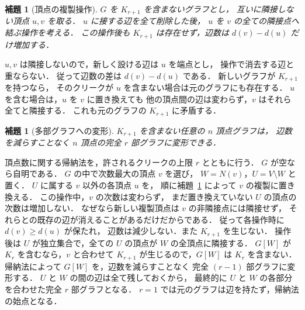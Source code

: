 \documentclass[a5paper,10pt,onecolumn]{jsarticle}
\makeatletter
\theoremstyle{mathnotetheorem}
\newtheorem{lemma}[theorem]{補題}
\renewcommand{\proofname}{証明}
\renewenvironment{proof}[1][\proofname]{%
  \par\pushQED{\qed}\normalfont\topsep4\p@\@plus2\p@\relax
  \trivlist\item[\hskip\labelsep\bfseries #1]\ignorespaces
}{\popQED\endtrivlist\@endpefalse}
\makeatother
\begin{document}
\begin{lemma}[頂点の複製操作]\label{lem:clone}
$G$ を $K_{r+1}$ を含まないグラフとし，
互いに隣接しない頂点 $u,v$ を取る．
$u$ に接する辺を全て削除した後，
$u$ を $v$ の全ての隣接点へ結ぶ操作を考える．
この操作後も $K_{r+1}$ は存在せず，辺数は
$d(v)-d(u)$ だけ増加する．
\end{lemma}
\begin{proof}
$u,v$ は隣接しないので，新しく設ける辺は $u$ を端点とし，
操作で消去する辺と重ならない．
従って辺数の差は $d(v)-d(u)$ である．
新しいグラフが $K_{r+1}$ を持つなら，
そのクリークが $u$ を含まない場合は元のグラフにも存在する．
$u$ を含む場合は，$u$ を $v$ に置き換えても
他の頂点間の辺は変わらず，$v$ はそれら全てと隣接する．
これも元のグラフの $K_{r+1}$ に矛盾する．
\end{proof}

\begin{lemma}[多部グラフへの変形]\label{lem:symmetrization}
$K_{r+1}$ を含まない任意の $n$ 頂点グラフは，
辺数を減らすことなく $n$ 頂点の完全 $r$ 部グラフに変形できる．
\end{lemma}
\begin{proof}
頂点数に関する帰納法を，許されるクリークの上限 $r$ とともに行う．
$G$ が空なら自明である．
$G$ の中で次数最大の頂点 $v$ を選び，
$W=N(v)$，$U=V\setminus W$ と置く．
$U$ に属する $v$ 以外の各頂点 $u$ を，
順に補題~\ref{lem:clone} によって $v$ の複製に置き換える．
この操作中，$v$ の次数は変わらず，
まだ置き換えていない $U$ の頂点の次数は増加しない．
なぜなら新しい複製頂点は $v$ の非隣接点には隣接せず，
それらとの既存の辺が消えることがあるだけだからである．
従って各操作時に $d(v)\ge d(u)$ が保たれ，
辺数は減少しない．また $K_{r+1}$ を生じない．
操作後は $U$ が独立集合で，全ての $U$ の頂点が
$W$ の全頂点に隣接する．
$G[W]$ が $K_r$ を含むなら，$v$ と合わせて
$K_{r+1}$ が生じるので，$G[W]$ は $K_r$ を含まない．
帰納法によって $G[W]$ を，辺数を減らすことなく
完全 $(r-1)$ 部グラフに変形する．
$U$ と $W$ の間の辺は全て残しておくから，
最終的に $U$ と $W$ の各部分を合わせた完全 $r$ 部グラフとなる．
$r=1$ では元のグラフは辺を持たず，帰納法の始点となる．
\end{proof}
\end{document}
